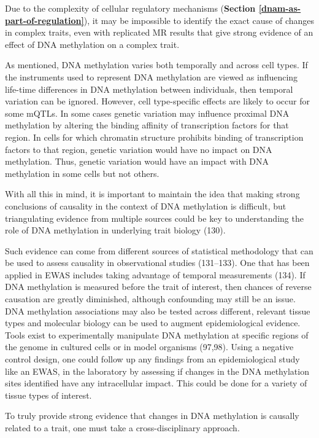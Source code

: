 \documentclass[11pt,oneside]{bristolthesis}
\begin{document}
Due to the complexity of cellular regulatory mechanisms (\textbf{Section \ref{dnam-as-part-of-regulation}}), it may be impossible to identify the exact cause of changes in complex traits, even with replicated MR results that give strong evidence of an effect of DNA methylation on a complex trait.

As mentioned, DNA methylation varies both temporally and across cell types. If the instruments used to represent DNA methylation are viewed as influencing life-time differences in DNA methylation between individuals, then temporal variation can be ignored. However, cell type-specific effects are likely to occur for some mQTLs. In some cases genetic variation may influence proximal DNA methylation by altering the binding affinity of transcription factors for that region. In cells for which chromatin structure prohibits binding of transcription factors to that region, genetic variation would have no impact on DNA methylation. Thus, genetic variation would have an impact with DNA methylation in some cells but not others.

With all this in mind, it is important to maintain the idea that making strong conclusions of causality in the context of DNA methylation is difficult, but triangulating evidence from multiple sources could be key to understanding the role of DNA methylation in underlying trait biology (130).

Such evidence can come from different sources of statistical methodology that can be used to assess causality in observational studies (131--133). One that has been applied in EWAS includes taking advantage of temporal measurements (134). If DNA methylation is measured before the trait of interest, then chances of reverse causation are greatly diminished, although confounding may still be an issue. DNA methylation associations may also be tested across different, relevant tissue types and molecular biology can be used to augment epidemiological evidence. Tools exist to experimentally manipulate DNA methylation at specific regions of the genome in cultured cells or in model organisms (97,98). Using a negative control design, one could follow up any findings from an epidemiological study like an EWAS, in the laboratory by assessing if changes in the DNA methylation sites identified have any intracellular impact. This could be done for a variety of tissue types of interest.

To truly provide strong evidence that changes in DNA methylation is causally related to a trait, one must take a cross-disciplinary approach.
\end{document}

